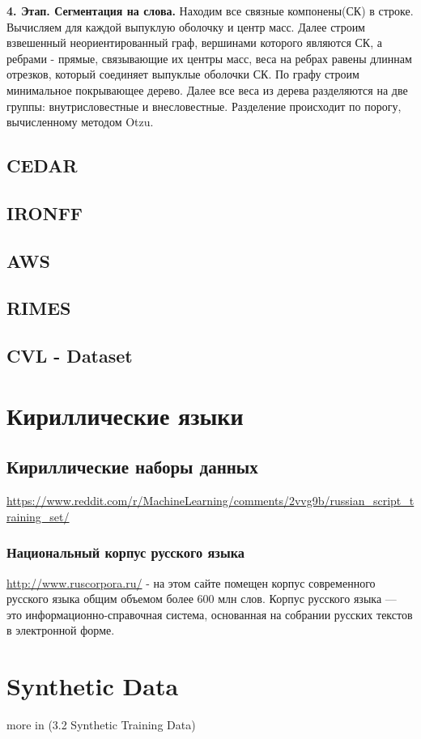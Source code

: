  \textbf{4. Этап. Сегментация на слова.} Находим все связные компонены(СК) в строке. Вычисляем для каждой выпуклую оболочку и центр масс. Далее строим взвешенный неориентированный граф, вершинами которого являются СК, а ребрами - прямые, связывающие их центры масс, веса на ребрах равены длиннам отрезков, который соединяет выпуклые оболочки СК. По графу строим минимальное покрывающее дерево. Далее все веса из дерева разделяются на две группы: внутрисловестные и внесловестные. Разделение происходит по порогу, вычисленному методом Otzu.


\subsection{CEDAR}
\subsection{IRONFF}
\subsection{AWS}
\subsection{RIMES}
\subsection{CVL - Dataset}

\section{Кириллические языки}
\subsection{Кириллические наборы данных}

\url{https://www.reddit.com/r/MachineLearning/comments/2vvg9b/russian_script_training_set/}

\subsubsection{Национальный корпус русского языка}

\url{http://www.ruscorpora.ru/} - на этом сайте помещен корпус современного русского языка общим объемом более 600 млн слов. Корпус русского языка — это информационно-справочная система, основанная на собрании русских текстов в электронной форме.


\section{Synthetic Data}
more in \cite{bunke2003recognition} (3.2 Synthetic Training Data)

